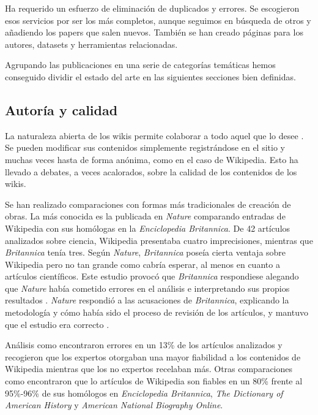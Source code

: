 \documentclass[11pt,onecolumn]{article}
\begin{document}
Ha requerido un esfuerzo de eliminación de duplicados y errores. Se escogieron esos servicios por ser los más completos, aunque seguimos en búsqueda de otros y añadiendo los papers que salen nuevos. También se han creado páginas para los autores, datasets y herramientas relacionadas.

Agrupando las publicaciones en una serie de categorías temáticas hemos conseguido dividir el estado del arte en las siguientes secciones bien definidas.

\subsection{Autoría y calidad}


La naturaleza abierta de los wikis permite colaborar a todo aquel que lo desee \citep{ward2001}. Se pueden modificar sus contenidos simplemente registrándose en el sitio y muchas veces hasta de forma anónima, como en el caso de Wikipedia. Esto ha llevado a debates, a veces acalorados, sobre la calidad de los contenidos de los wikis.

Se han realizado comparaciones con formas más tradicionales de creación de obras. La más conocida es la publicada en \emph{Nature} \citep{giles2005} comparando entradas de Wikipedia con sus homólogas en la \emph{Enciclopedia Britannica}. De 42 artículos analizados sobre ciencia, Wikipedia presentaba cuatro imprecisiones, mientras que \emph{Britannica} tenía tres. Según \emph{Nature}, \emph{Britannica} poseía cierta ventaja sobre Wikipedia pero no tan grande como cabría esperar, al menos en cuanto a artículos científicos. Este estudio provocó que \emph{Britannica} respondiese alegando que \emph{Nature} había cometido errores en el análisis e interpretando sus propios resultados \citep{britannica2006}. \emph{Nature} respondió a las acusaciones de \emph{Britannica}, explicando la metodología y cómo había sido el proceso de revisión de los artículos, y mantuvo que el estudio era correcto \citep{nature2006}.

Análisis como \citep{chesney2006} encontraron errores en un 13\% de los artículos analizados y recogieron que los expertos otorgaban una mayor fiabilidad a los contenidos de Wikipedia mientras que los no expertos recelaban más. Otras comparaciones como \citep{holman2008} encontraron que lo artículos de Wikipedia son fiables en un 80\% frente al 95\%-96\% de sus homólogos en \emph{Enciclopedia Britannica}, \emph{The Dictionary of American History} y \emph{American National Biography Online}.
\end{document}
